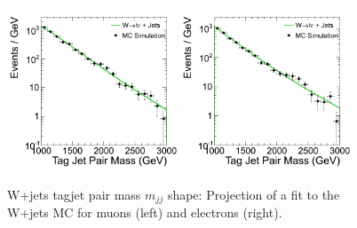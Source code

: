\begin{figure}
\begin{center}
\includegraphics[width=0.45\textwidth]{figs/wpj/EWKW2jetstagjetmjj_WpJ_muon_Model_12_Validate.png}
\includegraphics[width=0.45\textwidth]{figs/wpj/EWKW2jetstagjetmjj_WpJ_electron_Model_12_Validate.png}
\end{center}
\caption{\label{fig:WpJFit} W+jets tagjet pair mass $m_{jj}$ shape:
Projection of a fit to the W+jets MC for muons (left) and electrons (right).}
\label{fig:WpJFit_Dijet}
\end{figure}

